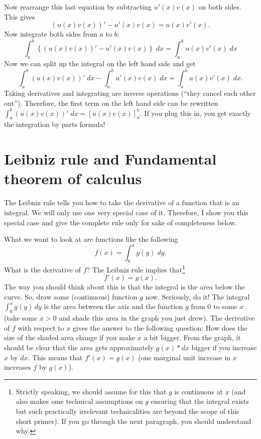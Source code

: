 \documentclass[a4paper,12pt]{article}
\begin{document}
Now rearrange this last equation by subtracting $u'(x)v(x)$ on both sides. This gives
\begin{equation*}
  \left(u(x) v(x)\right)'-u'(x)v(x)=u(x)v'(x).
\end{equation*}
Now integrate both sides from $a$ to $b$:
\begin{equation*}
  \int_a^b\left\{(u(x) v(x))'-u'(x)v(x)\right\}\;dx=\int_a^bu(x)v'(x)\;dx
\end{equation*}
Now we can split up the integral on the left hand side and get
\begin{equation*}
  \int_a^b\left(u(x) v(x)\right)' \;dx-\int_a^bu'(x)v(x)\;dx=\int_a^bu(x)v'(x)\;dx.
\end{equation*}
Taking derivatives and integrating are inverse operations (``they cancel each other out''). Therefore, the first term on the left hand side can be rewritten $\int_a^b\left(u(x) v(x)\right)' \;dx=\left[ u(x) v(x)\right]_a^b$. If you plug this in, you get exactly the integration by parts formula!



\section{Leibniz rule and Fundamental theorem of calculus}
\label{sec:leibniz-rule}

The Leibniz rule tells you how to take the derivative of a function that is an integral. We will only use one very special case of it. Therefore, I show you this special case and give the complete rule only for sake of completeness below.

What we want to look at are functions like the following
$$f(x)=\int_0^x g(y) \;dy.$$
What is the derivative of $f$? The Leibniz rule implies that\footnote{Strictly speaking, we should assume for this that $g$ is continuous at $x$ (and also makes ome technical assumptions on $g$ ensuring that the integral exists but such practically irrelevant technicalities are beyond the scope of this short primer). If you go through the next paragraph, you should understand why.}
$$f'(x)=g(x).$$
The way you should think about this is that the integral is the area below the curve. So, draw some (continuous) function $g$ now. Seriously, do it! The integral $\int_0^xg(y)\, dy$ is the area between the axis and the function $g$ from $0$ to some $x$ (take some $x>0$ and shade this area in the graph you just drew). The derivative of $f$ with respect to $x$ gives the answer to the following question: How does the size of the shaded area change if you make $x$ a bit bigger. From the graph, it should be clear that the area gets approximately $g(x)*dx$ bigger if you increase $x$ by $dx$. This means that $f'(x)=g(x)$ (one marginal unit increase in $x$ increases $f$ by $g(x)$).
\end{document}
